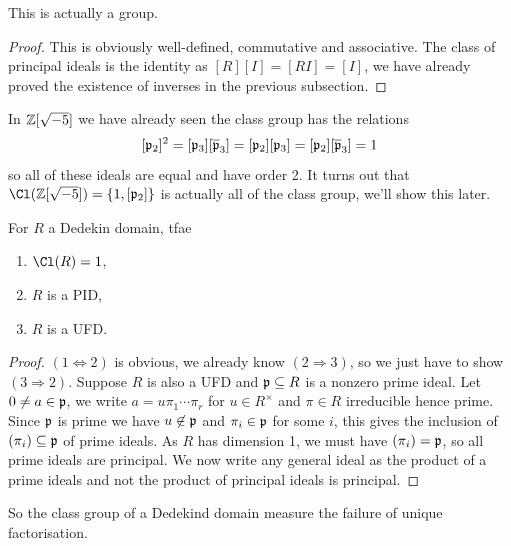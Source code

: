 \documentclass{article}
\begin{document}
\begin{proposition}
    This is actually a group.
    \begin{proof}
        This is obviously well-defined, commutative and associative. The class of principal ideals is the identity as $[R][I]=[RI]=[I]$, we have already proved the existence of inverses in the previous subsection.
    \end{proof}
\end{proposition}

In $\mathbb{Z}[\sqrt{-5}]$ we have already seen the class group has the relations \[
[\mathfrak{p}_2]^2 = [\mathfrak{p}_3][\overline{\mathfrak{p}}_3] = [\mathfrak{p}_2][\mathfrak{p}_3] = [\mathfrak{p}_2][\overline{\mathfrak{p}}_3] = 1
\] so all of these ideals are equal and have order 2. It turns out that $\Cl(\bZ[\sqrt{-5}])=\{1,[\fp_2]\}$ is actually all of the class group, we'll show this later.

\begin{proposition}
    For $R$ a Dedekin domain, tfae \begin{enumerate}
        \item $\Cl(R)=1$,
        \item $R$ is a PID,
        \item $R$ is a UFD.
    \end{enumerate}
    \begin{proof}
        $(1\Leftrightarrow 2)$ is obvious, we already know $(2\Rightarrow 3)$, so we just have to show $(3\Rightarrow 2)$. Suppose $R$ is also a UFD and $\mathfrak{p}\subseteq R$ is a nonzero prime ideal. Let $0\neq a\in \mathfrak{p}$, we write $a=u\pi_1\cdots\pi_r$ for $u\in R^\times$ and $\pi\in R$ irreducible hence prime. Since $\mathfrak{p}$ is prime we have $u\not\in\mathfrak{p}$ and $\pi_i\in\mathfrak{p}$ for some $i$, this gives the inclusion of $(\pi_i)\subseteq \mathfrak{p}$ of prime ideals. As $R$ has dimension 1, we must have $(\pi_i)=\mathfrak{p}$, so all prime ideals are principal. We now write any general ideal as the product of a prime ideals and not the product of principal ideals is principal.
    \end{proof}
\end{proposition}

So the class group of a Dedekind domain measure the failure of unique factorisation.
\end{document}
